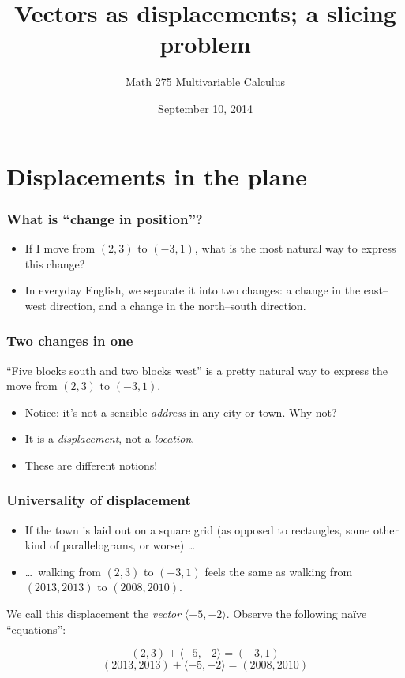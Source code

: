 \documentclass[11pt,ignorenonframetext,aspectratio=169]{beamer}
\title{Vectors as displacements; a slicing problem}
\author{Math 275 Multivariable Calculus}
\date{September 10, 2014}
\begin{document}
\frame{\titlepage}

\section{Displacements in the plane}

\begin{frame}\frametitle{What is ``change in position''?}

\begin{itemize}[<+->]
\item
  If I move from $(2,3)$ to $(-3, 1)$, what is the most natural way to
  express this change?
\item
  In everyday English, we separate it into two changes: a change in the
  east--west direction, and a change in the north--south direction.
\end{itemize}

\end{frame}

\begin{frame}\frametitle{Two changes in one}

``Five blocks south and two blocks west'' is a pretty natural way to
express the move from $(2,3)$ to $(-3, 1)$.

\begin{itemize}

\item
  Notice: it's not a sensible \emph{address} in any city or town. Why
  not?
\item
  It is a \emph{displacement}, not a \emph{location}.
\item
  These are different notions!
\end{itemize}

\end{frame}

\begin{frame}\frametitle{Universality of displacement}

\begin{itemize}

\item
  If the town is laid out on a square grid (as opposed to rectangles,
  some other kind of parallelograms, or worse) \ldots
\item
  \ldots~walking from $(2,3)$ to $(-3, 1)$ feels the same as walking
  from $(2013,2013)$ to $(2008,2010)$.
\end{itemize}

We call this displacement the \emph{vector} $\langle -5, -2 \rangle$.
Observe the following na\"ive ``equations'':

\begin{equation*}
(2,3) + \langle -5, -2 \rangle = (-3, 1)
\end{equation*}
\begin{equation*}
(2013,2013) + \langle -5, -2 \rangle = (2008,2010)
\end{equation*}

\end{frame}
\end{document}
